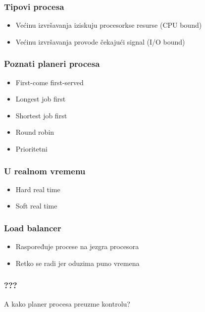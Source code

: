 \documentclass{beamer}
\begin{document}
\begin{frame}
    \frametitle{Tipovi procesa}
    \begin{itemize}
        \item Većinu izvršavanja iziskuju procesorkse resurse (CPU bound) \newline
        \item Većinu izvršavanja provode čekajući signal (I/O bound)
    \end{itemize}
\end{frame}

\begin{frame}
    \frametitle{Poznati planeri procesa}
    \begin{itemize}
        \item First-come first-served \newline
        \item Longest job first \newline
        \item Shortest job first \newline
        \item Round robin \newline
        \item Prioritetni
    \end{itemize}
\end{frame}

\begin{frame}
    \frametitle{U realnom vremenu}
    \begin{itemize}
        \item Hard real time \newline
        \item Soft real time
    \end{itemize}
\end{frame}

\begin{frame}
    \frametitle{Load balancer}
    \begin{itemize}
        \item Raspoređuje procese na jezgra procesora \newline
        \item Retko se radi jer oduzima puno vremena
    \end{itemize}
\end{frame}

\begin{frame}
    \frametitle{???}
    \begin{center}
        \LARGE{A kako planer procesa preuzme kontrolu?}
    \end{center}
\end{frame}
\end{document}

